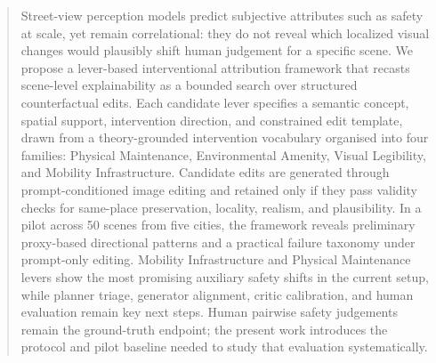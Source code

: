 \begin{abstract}
    Street-view perception models predict subjective attributes such as safety at scale, yet remain correlational: they do not reveal which localized visual changes would plausibly shift human judgement for a specific scene. We propose a lever-based interventional attribution framework that recasts scene-level explainability as a bounded search over structured counterfactual edits. Each candidate lever specifies a semantic concept, spatial support, intervention direction, and constrained edit template, drawn from a theory-grounded intervention vocabulary organised into four families: Physical Maintenance, Environmental Amenity, Visual Legibility, and Mobility Infrastructure. Candidate edits are generated through prompt-conditioned image editing and retained only if they pass validity checks for same-place preservation, locality, realism, and plausibility. In a pilot across 50 scenes from five cities, the framework reveals preliminary proxy-based directional patterns and a practical failure taxonomy under prompt-only editing. Mobility Infrastructure and Physical Maintenance levers show the most promising auxiliary safety shifts in the current setup, while planner triage, generator alignment, critic calibration, and human evaluation remain key next steps. Human pairwise safety judgements remain the ground-truth endpoint; the present work introduces the protocol and pilot baseline needed to study that evaluation systematically.
\end{abstract}
